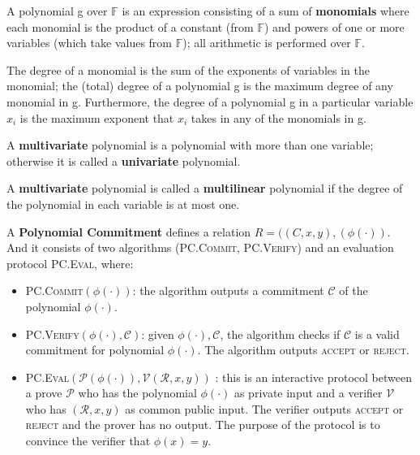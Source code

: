 \begin{definition}
A polynomial g over $\mathbb{F}$ is an expression consisting of a sum of \textbf{monomials} where each monomial is the product of a constant (from $\mathbb{F}$) and powers of one or more variables (which take values from $\mathbb{F}$); all arithmetic is performed over $\mathbb{F}$.
\end{definition}

\begin{definition}
The degree of a monomial is the sum of the exponents of variables in the monomial; the (total) degree of a polynomial g is the maximum degree of any monomial in g. Furthermore, the degree of a polynomial g in a particular variable $x_i$ is the maximum exponent that $x_i$ takes in any of the monomials in g.
\end{definition}

\begin{definition}
A \textbf{multivariate} polynomial is a polynomial with more than one variable; otherwise it is called a \textbf{univariate} polynomial.
\end{definition}

\begin{definition}
A \textbf{multivariate} polynomial is called a \textbf{multilinear} polynomial if the degree of the polynomial in each variable is at most one.
\end{definition}

\begin{definition}
A \textbf{Polynomial Commitment} defines a relation $R = ((C, x, y), (\phi(\cdot))$. 
And it consists of two algorithms (\textsc{PC.Commit}, \textsc{PC.Verify}) and an evaluation protocol \textsc{PC.Eval}, where:

\begin{itemize}
    \item \textsc{PC.Commit}$(\phi(\cdot))$: the algorithm outputs a commitment $\mathcal{C}$ of the polynomial $\phi(\cdot)$.
    
    \item \textsc{PC.Verify}$(\phi(\cdot), \mathcal{C})$: given $\phi(\cdot), \mathcal{C}$, the algorithm checks if $\mathcal{C}$ is a valid commitment for polynomial $\phi(\cdot)$. The algorithm outputs \textsc{accept} or \textsc{reject}.
    
    \item \textsc{PC.Eval}$(\mathcal{P}(\phi(\cdot)), \mathcal{V}(\mathcal{R}, x, y))$ : this is an  interactive protocol between a prove $\mathcal{P}$ who has the polynomial $\phi(\cdot)$ as private input and a verifier $\mathcal{V}$ who has $(\mathcal{R}, x, y)$ as common public input. The verifier outputs \textsc{accept} or \textsc{reject} and the prover has no output. The purpose of the protocol is to convince the verifier that $\phi(x) = y$.
\end{itemize}

\end{definition}

